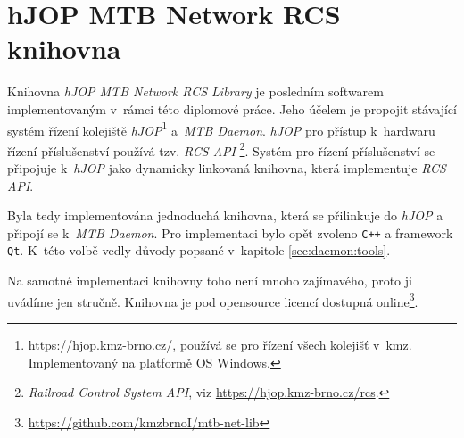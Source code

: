 \newpage
\section{hJOP MTB Network RCS knihovna} \label{sec:mtb-net-lib}

Knihovna \textit{hJOP MTB Network RCS Library} je posledním softwarem implementovaným
v~rámci této diplomové práce. Jeho účelem je propojit stávající systém řízení
kolejiště \textit{hJOP}\footnote{\url{https://hjop.kmz-brno.cz/}, používá se
pro řízení všech kolejišť v~\gls{kmz}. Implementovaný na platformě OS Windows.}
a~\textit{MTB Daemon}. \textit{hJOP} pro přístup k~hardwaru řízení
příslušenství používá tzv. \textit{RCS API} \footnote{\textit{Railroad Control
System API}, viz \url{https://hjop.kmz-brno.cz/rcs}.}. Systém pro řízení
příslušenství se připojuje k~\textit{hJOP} jako dynamicky linkovaná knihovna,
která implementuje \textit{RCS API}.

Byla tedy implementována jednoduchá knihovna, která se přilinkuje do
\textit{hJOP} a připojí se k~\textit{MTB Daemon}. Pro implementaci bylo
opět zvoleno \texttt{C++} a framework \texttt{Qt}. K~této volbě vedly důvody
popsané v~kapitole \ref{sec:daemon:tools}.

Na samotné implementaci knihovny toho není mnoho zajímavého, proto ji uvádíme
jen stručně. Knihovna je pod opensource licencí dostupná
online\footnote{\url{https://github.com/kmzbrnoI/mtb-net-lib}}.

